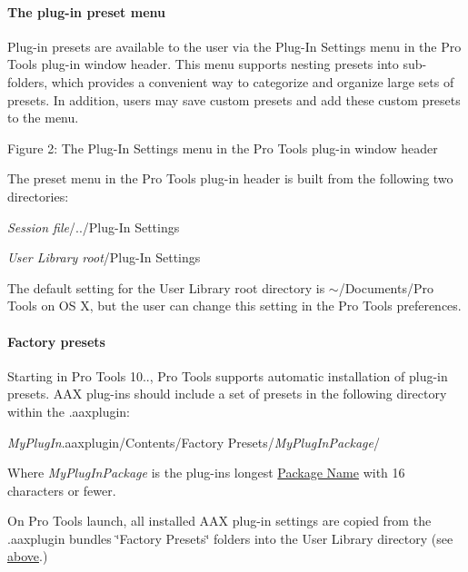 \hypertarget{a00360_subsubsection__plugin_preset_menu_}{}\paragraph{The plug-\/in preset menu}\label{a00360_subsubsection__plugin_preset_menu_}
 Plug-\/in presets are available to the user via the Plug-\/\+In Settings menu in the Pro Tools plug-\/in window header. This menu supports nesting presets into sub-\/folders, which provides a convenient way to categorize and organize large sets of presets. In addition, users may save custom presets and add these custom presets to the menu.

  Figure 2\+: The Plug-\/\+In Settings menu in the Pro Tools plug-\/in window header

The preset menu in the Pro Tools plug-\/in header is built from the following two directories\+:


\begin{DoxyItemize}
\item {\itshape Session file}/../\+Plug-\/\+In Settings  
\item {\itshape User Library root}/\+Plug-\/\+In Settings  
\end{DoxyItemize}

The default setting for the User Library root directory is $\sim$/\+Documents/\+Pro Tools on O\+S X, but the user can change this setting in the Pro Tools preferences.

\hypertarget{a00360_subsubsection__plugin_presets_}{}\paragraph{Factory presets}\label{a00360_subsubsection__plugin_presets_}
 Starting in Pro Tools 10.., Pro Tools supports automatic installation of plug-\/in presets. A\+A\+X plug-\/ins should include a set of presets in the following directory within the .aaxplugin\+:


\begin{DoxyItemize}
\item {\itshape My\+Plug\+In}.aaxplugin/\+Contents/\+Factory Presets/{\itshape My\+Plug\+In\+Package}/  
\end{DoxyItemize}

Where {\itshape My\+Plug\+In\+Package} is the plug-\/in\textquotesingle{}s longest \hyperlink{a00087_acf7410e0d06cf64bea36bf7d18b3456c}{Package Name} with 16 characters or fewer.

On Pro Tools launch, all installed A\+A\+X plug-\/in settings are copied from the .aaxplugin bundles\textquotesingle{} \char`\"{}\+Factory Presets\char`\"{} folders into the User Library directory (see \hyperlink{a00360_subsubsection__plugin_preset_menu_}{above}.)

